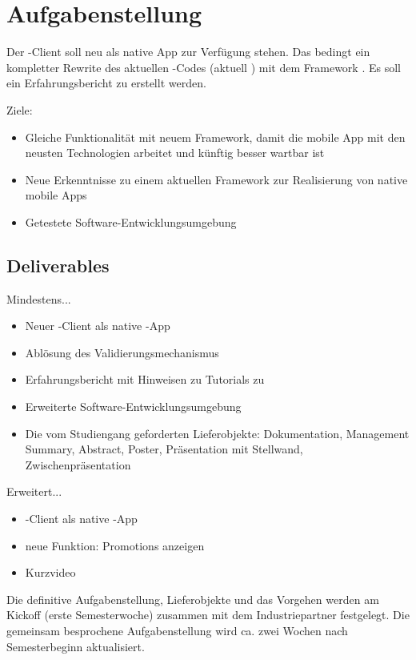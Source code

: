 \chapter*{Aufgabenstellung}
\thispagestyle{scrheadings}

Der \kort{}-Client soll neu als native  App zur Verfügung stehen. Das bedingt ein kompletter Rewrite des aktuellen -Codes (aktuell ) mit dem \gls{Framework} . Es soll ein Erfahrungsbericht zu  erstellt werden.

Ziele:
\begin{itemize}
	\item Gleiche Funktionalität mit neuem Framework, damit die mobile App mit den neusten Technologien arbeitet und künftig besser wartbar ist
	\item Neue Erkenntnisse zu einem aktuellen Framework zur Realisierung von native mobile
Apps 
	\item Getestete Software-Entwicklungsumgebung
\end{itemize}

\section*{Deliverables}
Mindestens...
\begin{itemize}
	\item Neuer \kort{}-Client als native -App
	\item Ablösung des Validierungsmechanismus
	\item Erfahrungsbericht mit Hinweisen zu Tutorials zu 
	\item Erweiterte Software-Entwicklungsumgebung
	\item Die vom Studiengang geforderten Lieferobjekte: Dokumentation, Management Summary, Abstract, Poster, Präsentation mit Stellwand, Zwischenpräsentation
\end{itemize}

Erweitert...
\begin{itemize}
	\item \kort{}-Client als native -App
	\item neue Funktion: Promotions anzeigen
	\item Kurzvideo
\end{itemize}

Die definitive Aufgabenstellung, Lieferobjekte und das Vorgehen werden am Kickoff (erste Semesterwoche) zusammen mit dem Industriepartner festgelegt. Die gemeinsam besprochene Aufgabenstellung wird ca. zwei Wochen nach Semesterbeginn aktualisiert.

